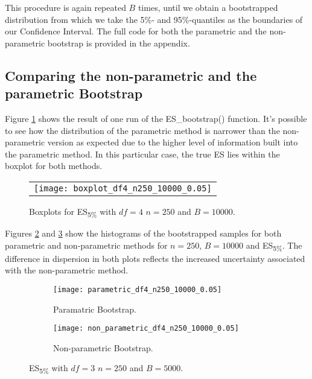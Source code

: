\documentclass[11pt, a4paper]{article}
\begin{document}
This procedure is again repeated $B$ times, until we obtain a bootstrapped distribution from which we take the 5\%- and 95\%-quantiles as the boundaries of our Confidence Interval. The full code for both the parametric and the non-parametric bootstrap is provided in the appendix.\\ 

\subsection{Comparing the non-parametric and the parametric Bootstrap}
Figure \ref{fig1} shows the result of one run of the ES\_bootstrap() function. It's possible to see how the distribution of the parametric method is narrower than the non-parametric version as expected due to the higher level of information built into the parametric method. In this particular case, the true ES lies within the boxplot for both methods.

	\begin{figure}[!htb]\center 
		\begin{tabular}{c}
			\texttt{[image: boxplot\_df4\_n250\_10000\_0.05]}
		\end{tabular}
		\caption{\footnotesize Boxplots for ES\textsubscript{5\%} with $df=4$ $n=250$ and $B=10000$.}
		\label{fig1}
	\end{figure}

Figures \ref{fig2a} and \ref{fig2b} show the histograms of the bootstrapped samples for both parametric and non-parametric methods for $n=250$, $B=10000$ and ES\textsubscript{5\%}. The difference in dispersion in both plots reflects the increased uncertainty associated with the non-parametric method.

	\begin{figure}[!htb]
		\centering 
		\begin{subfigure}{.4\linewidth}
			\centering
			\texttt{[image: parametric\_df4\_n250\_10000\_0.05]}
		\caption{\footnotesize Paramatric Bootstrap. }
		\label{fig2a}
		\end{subfigure} %
		\begin{subfigure}{.4\linewidth}
			\centering
			\texttt{[image: non\_parametric\_df4\_n250\_10000\_0.05]}
			\caption{\footnotesize Non-parametric Bootstrap.}
			\label{fig2b}
		\end{subfigure}
		\caption{\footnotesize ES\textsubscript{5\%} with $df=3$ $n=250$ and $B=5000$.}
		\label{fig2}
	\end{figure}
\end{document}
